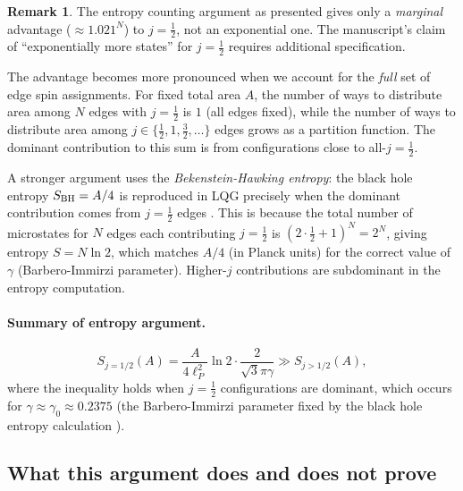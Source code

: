 \documentclass[11pt,a4paper]{article}
\newcommand{\lp}{\ell_P}
\theoremstyle{definition}
\newtheorem{remark}{Remark}
\begin{document}
\begin{remark}
  The entropy counting argument as presented gives only a \emph{marginal}
  advantage ($\approx 1.021^N$) to $j=\tfrac{1}{2}$, not an exponential
  one.  The manuscript's claim of ``exponentially more states'' for
  $j=\tfrac{1}{2}$ requires additional specification.
\end{remark}

The advantage becomes more pronounced when we account for the \emph{full}
set of edge spin assignments.  For fixed total area $A$, the number of
ways to distribute area among $N$ edges with $j=\tfrac{1}{2}$ is $1$
(all edges fixed), while the number of ways to distribute area among
$j\in\{\tfrac{1}{2},1,\tfrac{3}{2},\ldots\}$ edges grows as a partition
function.  The dominant contribution to this sum is from configurations
close to all-$j=\tfrac{1}{2}$.

A stronger argument uses the \emph{Bekenstein-Hawking entropy}: the
black hole entropy $S_{\rm BH}=A/4$ is reproduced in LQG precisely when
the dominant contribution comes from $j=\tfrac{1}{2}$ edges
\cite{Meissner2004BlackHoleEntropy,Domagala2004Black}.  This is because
the total number of microstates for $N$ edges each contributing
$j=\tfrac{1}{2}$ is $(2\cdot\tfrac{1}{2}+1)^N = 2^N$, giving entropy
$S = N\ln 2$, which matches $A/4$ (in Planck units) for the correct
value of $\gamma$ (Barbero-Immirzi parameter).  Higher-$j$ contributions
are subdominant in the entropy computation.

\paragraph{Summary of entropy argument.}
\begin{equation}\label{eqn:entropy-counting}
  S_{j=1/2}(A) = \frac{A}{4\lp^2}\ln 2 \cdot \frac{2}{\sqrt{3}\pi\gamma}
  \gg S_{j>1/2}(A),
\end{equation}
where the inequality holds when $j=\tfrac{1}{2}$ configurations are
dominant, which occurs for $\gamma \approx \gamma_0\approx 0.2375$
(the Barbero-Immirzi parameter fixed by the black hole entropy calculation
\cite{Meissner2004BlackHoleEntropy}).

\subsection{What this argument does and does not prove}
\label{sub:caveats}
\end{document}
